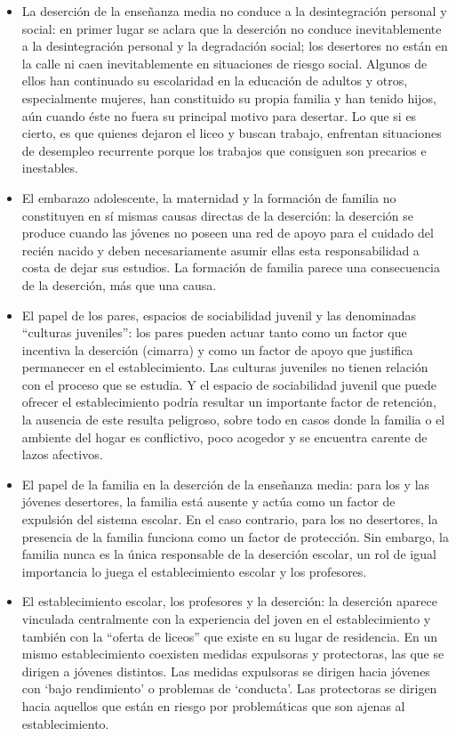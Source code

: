 \begin{itemize}
\item La deserción de la enseñanza media no conduce a la desintegración personal y social: en primer lugar se aclara que la deserción no conduce inevitablemente a la desintegración personal y la degradación social; los desertores no están en la calle ni caen inevitablemente en situaciones de riesgo social. Algunos de ellos han continuado su escolaridad en la educación de adultos y otros, especialmente mujeres, han constituido su propia familia y han tenido hijos, aún cuando éste no fuera su principal motivo para desertar. Lo que si es cierto, es que quienes dejaron el liceo y buscan trabajo, enfrentan situaciones de desempleo recurrente porque los trabajos que consiguen son precarios e inestables.
\item El embarazo adolescente, la maternidad y la formación de familia no constituyen en sí mismas causas directas de la deserción: la deserción se produce cuando las jóvenes no poseen una red de apoyo para el cuidado del recién nacido y deben necesariamente asumir ellas esta responsabilidad a costa de dejar sus estudios. La formación de familia parece una consecuencia  de la deserción, más que una causa. 
\item El papel de los pares, espacios de sociabilidad juvenil y las denominadas “culturas juveniles”: los pares pueden actuar tanto como un factor que incentiva la deserción (cimarra) y como un factor de apoyo que  justifica permanecer en el establecimiento.  Las culturas juveniles no tienen relación con el proceso que se estudia. Y el espacio de sociabilidad juvenil que puede ofrecer el establecimiento podría resultar un importante factor de retención, la ausencia de este resulta peligroso, sobre todo en casos donde la familia  o el ambiente del hogar es conflictivo, poco acogedor y se encuentra carente de lazos afectivos. \item El papel de la familia en la deserción de la enseñanza media: para los y las jóvenes desertores, la familia está ausente y actúa como un factor de expulsión del sistema escolar. En el caso contrario, para los no desertores, la presencia de la familia funciona como un factor de protección. Sin embargo, la familia nunca es la única responsable de la deserción escolar, un rol de igual importancia lo juega el establecimiento escolar y los profesores.  
\item El establecimiento escolar, los profesores y la deserción: la deserción aparece vinculada centralmente con la experiencia del joven en el establecimiento y también con la “oferta de liceos” que existe en su lugar de residencia. En un mismo establecimiento coexisten medidas expulsoras y protectoras, las que se dirigen a jóvenes distintos. Las medidas expulsoras se dirigen hacia jóvenes con ‘bajo rendimiento’ o problemas de ‘conducta’. Las protectoras se dirigen hacia aquellos que están en riesgo por problemáticas que son ajenas al establecimiento.

\end{itemize}
